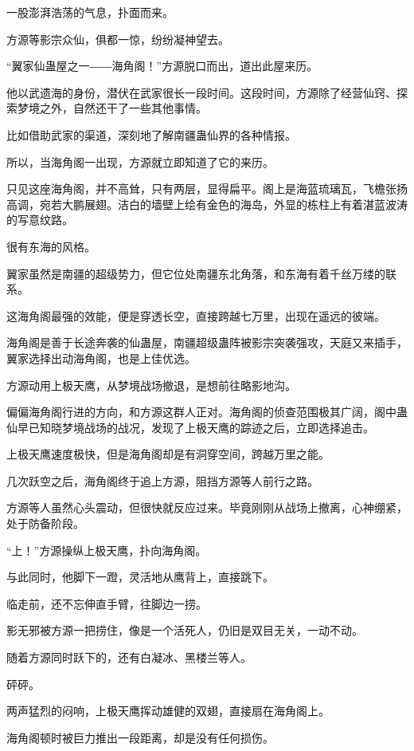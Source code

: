 
\begin{this_body}

一股澎湃浩荡的气息，扑面而来。

方源等影宗众仙，俱都一惊，纷纷凝神望去。

“翼家仙蛊屋之一――海角阁！”方源脱口而出，道出此屋来历。

他以武遗海的身份，潜伏在武家很长一段时间。这段时间，方源除了经营仙窍、探索梦境之外，自然还干了一些其他事情。

比如借助武家的渠道，深刻地了解南疆蛊仙界的各种情报。

所以，当海角阁一出现，方源就立即知道了它的来历。

只见这座海角阁，并不高耸，只有两层，显得扁平。阁上是海蓝琉璃瓦，飞檐张扬高调，宛若大鹏展翅。洁白的墙壁上绘有金色的海岛，外显的栋柱上有着湛蓝波涛的写意纹路。

很有东海的风格。

翼家虽然是南疆的超级势力，但它位处南疆东北角落，和东海有着千丝万缕的联系。

这海角阁最强的效能，便是穿透长空，直接跨越七万里，出现在遥远的彼端。

海角阁是善于长途奔袭的仙蛊屋，南疆超级蛊阵被影宗突袭强攻，天庭又来插手，翼家选择出动海角阁，也是上佳优选。

方源动用上极天鹰，从梦境战场撤退，是想前往略影地沟。

偏偏海角阁行进的方向，和方源这群人正对。海角阁的侦查范围极其广阔，阁中蛊仙早已知晓梦境战场的战况，发现了上极天鹰的踪迹之后，立即选择追击。

上极天鹰速度极快，但是海角阁却是有洞穿空间，跨越万里之能。

几次跃空之后，海角阁终于追上方源，阻挡方源等人前行之路。

方源等人虽然心头震动，但很快就反应过来。毕竟刚刚从战场上撤离，心神绷紧，处于防备阶段。

“上！”方源操纵上极天鹰，扑向海角阁。

与此同时，他脚下一蹬，灵活地从鹰背上，直接跳下。

临走前，还不忘伸直手臂，往脚边一捞。

影无邪被方源一把捞住，像是一个活死人，仍旧是双目无关，一动不动。

随着方源同时跃下的，还有白凝冰、黑楼兰等人。

砰砰。

两声猛烈的闷响，上极天鹰挥动雄健的双翅，直接扇在海角阁上。

海角阁顿时被巨力推出一段距离，却是没有任何损伤。


\end{this_body}
